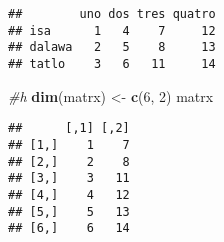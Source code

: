\documentclass[
]{article}
\newenvironment{Shaded}{\begin{snugshade}}{\end{snugshade}}
\newcommand{\CommentTok}[1]{\textcolor[rgb]{0.56,0.35,0.01}{\textit{#1}}}
\newcommand{\DecValTok}[1]{\textcolor[rgb]{0.00,0.00,0.81}{#1}}
\newcommand{\FunctionTok}[1]{\textcolor[rgb]{0.13,0.29,0.53}{\textbf{#1}}}
\newcommand{\NormalTok}[1]{#1}
\newcommand{\OtherTok}[1]{\textcolor[rgb]{0.56,0.35,0.01}{#1}}
\begin{document}
\begin{verbatim}
##        uno dos tres quatro
## isa      1   4    7     12
## dalawa   2   5    8     13
## tatlo    3   6   11     14
\end{verbatim}

\begin{Shaded}
\begin{Highlighting}[]
\CommentTok{\#h}
\FunctionTok{dim}\NormalTok{(matrx) }\OtherTok{\textless{}{-}} \FunctionTok{c}\NormalTok{(}\DecValTok{6}\NormalTok{, }\DecValTok{2}\NormalTok{)}
\NormalTok{matrx}
\end{Highlighting}
\end{Shaded}

\begin{verbatim}
##      [,1] [,2]
## [1,]    1    7
## [2,]    2    8
## [3,]    3   11
## [4,]    4   12
## [5,]    5   13
## [6,]    6   14
\end{verbatim}
\end{document}
